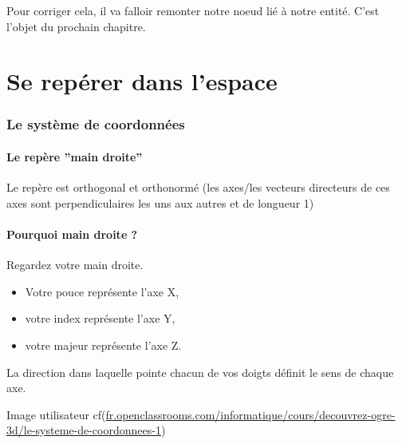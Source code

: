 \documentclass[10pt,a4paper]{report}
\begin{document}
Pour corriger cela, il va falloir remonter notre noeud li\'e \`{a} notre entit\'e. C'est l'objet du prochain chapitre.

























\part{Se rep\'erer dans l'espace}


\section{Le syst\`eme de coordonn\'ees}


\subsection{Le rep\`ere ''main droite''}

Le rep\`ere est orthogonal et orthonorm\'e (les axes/les vecteurs directeurs de ces axes sont perpendiculaires les uns aux autres et de longueur 1)



\subsection{Pourquoi main droite ?}

Regardez votre main droite.
\begin{itemize} 
\item Votre pouce repr\'esente l'axe X, 
\item votre index repr\'esente l'axe Y,
\item votre majeur repr\'esente l'axe Z. 
\end{itemize}

La direction dans laquelle pointe chacun de vos doigts d\'efinit le sens de chaque axe.

Image utilisateur cf(\url{fr.openclassrooms.com/informatique/cours/decouvrez-ogre-3d/le-systeme-de-coordonnees-1})
\end{document}

